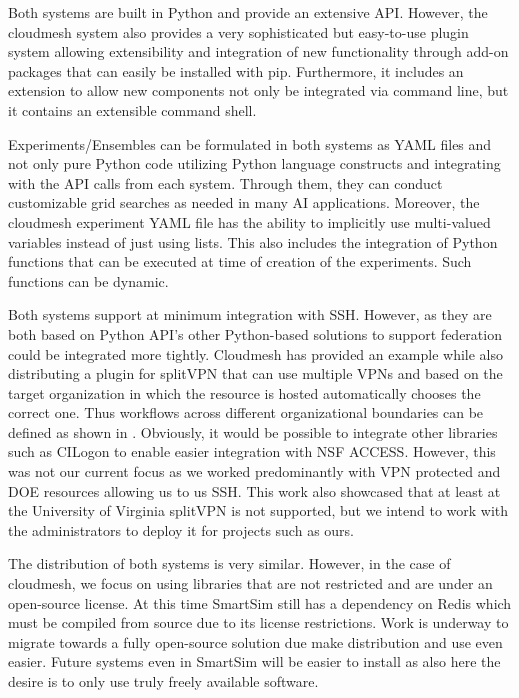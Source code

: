 \documentclass[utf8]{FrontiersinVancouver} %
\begin{document}
Both systems are built in Python and provide an extensive API. However, the cloudmesh system also provides a very sophisticated but easy-to-use plugin system allowing extensibility and integration of new functionality through add-on packages that can easily be installed with pip. Furthermore, it includes an extension to allow new components not only be integrated via command line, but it contains an extensible command shell.

Experiments/Ensembles can be formulated in both systems as YAML files and not only pure Python code utilizing Python language constructs and integrating with the API calls from each system. Through them, they can conduct customizable grid searches as needed in many AI applications. Moreover, the cloudmesh experiment YAML file has the ability to implicitly use multi-valued variables instead of just using lists. This also includes the integration of Python functions that can be executed at time of creation of the experiments. Such functions can be dynamic.

Both systems support at minimum integration with SSH. However, as they are both based on Python API's other Python-based solutions to support federation could be integrated more tightly. Cloudmesh has provided an example while also distributing a plugin for splitVPN that can use multiple VPNs and based on the target organization in which the resource is hosted automatically chooses the correct one. Thus workflows  
across different organizational boundaries can be defined as shown in \citep{las-frontiers-edu}. Obviously, it would be possible to integrate other libraries such as
CILogon to enable easier integration with NSF ACCESS. However, this was not our current focus as we worked predominantly with VPN protected and DOE resources allowing us to us SSH. This work also showcased that at least at the University of Virginia splitVPN is not supported, but we intend to work with the administrators to deploy it for projects such as ours.

The distribution of both systems is very similar. However, in the case of cloudmesh, we focus on using libraries that are not restricted and are under an open-source license. At this time SmartSim still has a dependency on Redis which must be compiled from source due to its license restrictions. Work is underway to migrate towards a fully open-source solution due make distribution and use even easier. Future systems even in SmartSim will be easier to install as also here the desire is to only use truly freely available software.
\end{document}
